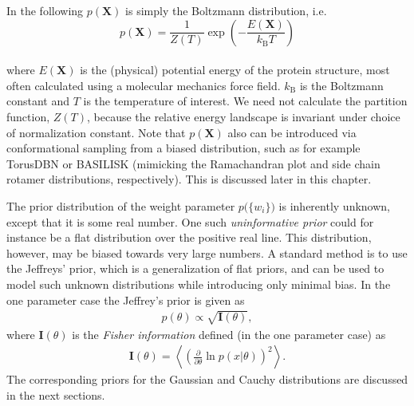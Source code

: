 In the following $p(\mathbf X)$ is simply the Boltzmann distribution, i.e. 
\begin{equation}
p(\mathbf X) = \frac{1}{Z(T)}\exp{\left(-\frac{E(\mathbf X)}{k_\mathrm{B}T}\right)}
\end{equation}\\
where $E(\mathbf X)$ is the (physical) potential energy of the protein structure, most often calculated using a molecular mechanics force field. $k_\mathrm{B}$ is the Boltzmann constant and $T$ is the temperature of interest.
We need not calculate the partition function, $Z(T)$, because the relative energy landscape is invariant under choice of normalization constant.
Note that $p(\mathbf X)$ also can be introduced via conformational sampling from a biased distribution, such as for example TorusDBN or BASILISK (mimicking the Ramachandran plot and side chain rotamer distributions, respectively). This is discussed later in this chapter.

The prior distribution of the weight parameter $p\Big(\{w_i\} \Big)$ is inherently unknown, except that it is some real number.
One such \textit{uninformative prior} could for instance be a flat distribution over the positive real line.
This distribution, however, may be biased towards very large numbers.
A standard method is to use the Jeffreys' prior, which is a generalization of flat priors, and can be used to model such unknown distributions while introducing only minimal bias.
In the one parameter case the Jeffrey's prior is given as
\begin{eqnarray}
    p(\theta) \propto \sqrt{\mathbf{I}(\theta)},
    \label{eq:jeffreys}
\end{eqnarray}
where $\mathbf{I}(\theta)$ is the \textit{Fisher information} defined (in the one parameter case) as
\begin{eqnarray}
    \mathbf{I}(\theta) = \left\langle \left( \frac{\partial}{\partial\theta} \ln p(x|\theta) \right)^2 \right\rangle.
\end{eqnarray}
The corresponding priors for the Gaussian and Cauchy distributions are discussed in the next sections.

